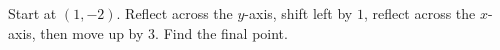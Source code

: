 \documentclass[preview]{standalone}
\begin{document}
\begin{center}
Start at $(1,-2)$. Reflect across the $y$-axis, shift left by $1$, reflect across the $x$-axis, then move up by $3$. Find the final point.
\end{center}
\end{document}

